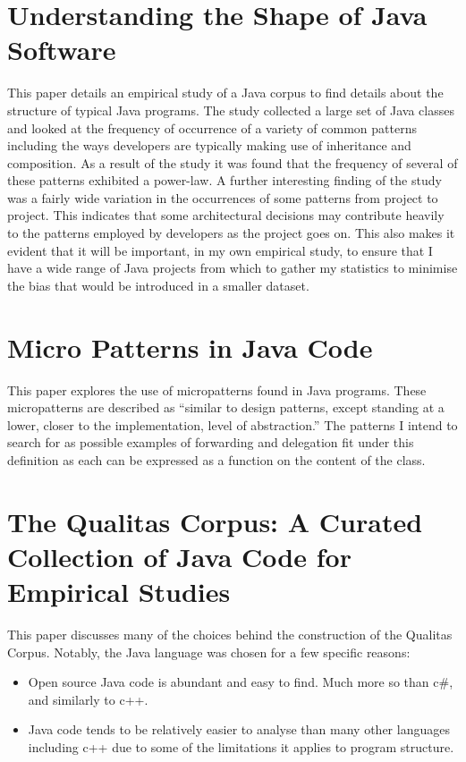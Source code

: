 \section{Understanding the Shape of Java Software~\cite{ShapeOfJava}}
This paper details an empirical study of a Java corpus to find details about the structure of typical Java programs. The study collected a large set of Java classes and looked at the frequency of occurrence of a variety of common patterns including the ways developers are typically making use of inheritance and composition. As a result of the study it was found that the frequency of several of these patterns exhibited a power-law. \newline
A further interesting finding of the study was a fairly wide variation in the occurrences of some patterns from project to project. This indicates that some architectural decisions may contribute heavily to the patterns employed by developers as the project goes on. This also makes it evident that it will be important, in my own empirical study, to ensure that I have a wide range of Java projects from which to gather my statistics to minimise the bias that would be introduced in a smaller dataset.

\section{Micro Patterns in Java Code~\cite{JavaMicropatterns}}
This paper explores the use of micropatterns found in Java programs. These micropatterns are described as “similar to design patterns, except standing at a lower, closer to the implementation, level of abstraction.”\newline
The patterns I intend to search for as possible examples of forwarding and delegation fit under this definition as each can be expressed as a function on the content of the class.

\section{The Qualitas Corpus: A Curated Collection of Java Code for Empirical Studies~\cite{QualitasCorpus}}
This paper discusses many of the choices behind the construction of the Qualitas Corpus. Notably, the Java language was chosen for a few specific reasons:
\begin{itemize}
	\item Open source Java code is abundant and easy to find. Much more so than c\#, and similarly to c++.
	\item Java code tends to be relatively easier to analyse than many other languages including c++ due to some of the limitations it applies to program structure.
\end{itemize}

